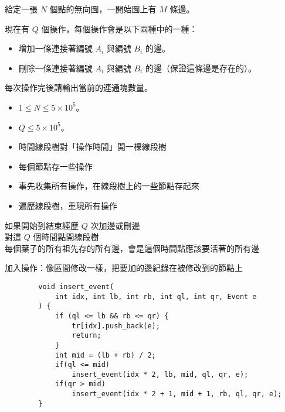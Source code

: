 \begin{frame}{\ebtitle}
    \begin{problem}
        給定一張 $N$ 個點的無向圖，一開始圖上有 $M$ 條邊。

        現在有 $Q$ 個操作，每個操作會是以下兩種中的一種：
        
        \begin{itemize}
            \item 增加一條連接著編號 $A_i$ 與編號 $B_i$ 的邊。
            \item 刪除一條連接著編號 $A_i$ 與編號 $B_i$ 的邊（保證這條邊是存在的）。
        \end{itemize}

        每次操作完後請輸出當前的連通塊數量。

        \begin{itemize}
            \item $1\le N\le 5\times 10^5$。
            \item $Q\le 5\times 10^5$。
        \end{itemize}
    \end{problem}
\end{frame}

\begin{frame}{\ebtitle}
    \begin{itemize}
        \item 時間線段樹對「操作時間」開一棵線段樹
        \item 每個節點存一些操作
        \item 事先收集所有操作，在線段樹上的一些節點存起來
        \item {} 遍歷線段樹，重現所有操作
    \end{itemize}
\end{frame}

\begin{frame}{\ebtitle}
    如果開始到結束經歷 $Q$ 次加邊或刪邊 \\
    對這 $Q$ 個時間點開線段樹 \\
    每個葉子的所有祖先存的所有邊，會是這個時間點應該要活著的所有邊
\end{frame}

\begin{frame}[fragile]{\ebtitle}
    加入操作：像區間修改一樣，把要加的邊紀錄在被修改到的節點上
    \begin{verbatim}
        void insert_event(
            int idx, int lb, int rb, int ql, int qr, Event e
        ) {
            if (ql <= lb && rb <= qr) {
                tr[idx].push_back(e);
                return;
            }   
            int mid = (lb + rb) / 2;
            if(ql <= mid)
                insert_event(idx * 2, lb, mid, ql, qr, e);
            if(qr > mid)
                insert_event(idx * 2 + 1, mid + 1, rb, ql, qr, e);
        }
    \end{verbatim}
\end{frame}

